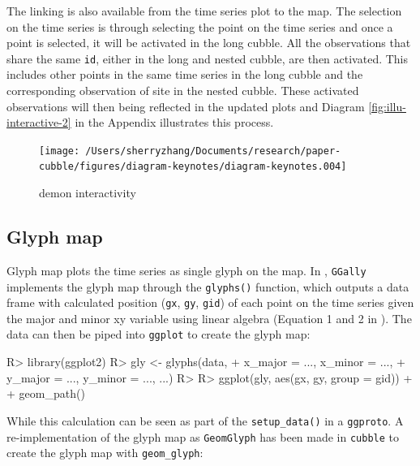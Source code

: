 \documentclass[
]{jss}
\begin{document}
The linking is also available from the time series plot to the map. The
selection on the time series is through selecting the point on the time
series and once a point is selected, it will be activated in the long
cubble. All the observations that share the same \texttt{id}, either in
the long and nested cubble, are then activated. This includes other
points in the same time series in the long cubble and the corresponding
observation of site in the nested cubble. These activated observations
will then being reflected in the updated plots and Diagram
\ref{fig:illu-interactive-2} in the Appendix illustrates this process.

\begin{CodeChunk}
\begin{figure}

{\centering \texttt{[image: /Users/sherryzhang/Documents/research/paper-cubble/figures/diagram-keynotes/diagram-keynotes.004]} 

}

\caption[demon interactivity]{demon interactivity}\label{fig:illu-interactive}
\end{figure}
\end{CodeChunk}

\hypertarget{glyph-map}{%
\subsection{Glyph map}\label{glyph-map}}

Glyph map \citep{Wickham2012-yr} plots the time series as single glyph
on the map. In , \texttt{GGally} implements the glyph map
through the \texttt{glyphs()} function, which outputs a data frame with
calculated position (\texttt{gx}, \texttt{gy}, \texttt{gid}) of each
point on the time series given the major and minor xy variable using
linear algebra (Equation 1 and 2 in \citet{Wickham2012-yr}). The data
can then be piped into \texttt{ggplot} to create the glyph map:

\begin{CodeChunk}
\begin{CodeInput}
R> library(ggplot2)
R> gly <- glyphs(data, 
+               x_major = ..., x_minor = ..., 
+               y_major = ..., y_minor = ..., ...)
R> 
R> ggplot(gly, aes(gx, gy, group = gid)) + 
+   geom_path() 
\end{CodeInput}
\end{CodeChunk}

While this calculation can be seen as part of the \texttt{setup\_data()}
in a \texttt{ggproto}. A re-implementation of the glyph map as
\texttt{GeomGlyph} has been made in \texttt{cubble} to create the glyph
map with \texttt{geom\_glyph}:
\end{document}
